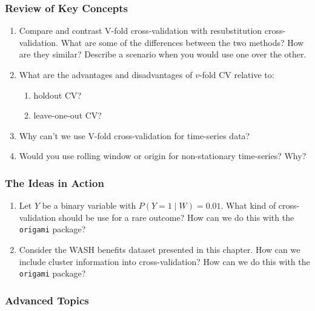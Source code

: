 \documentclass[12pt, krantz2,]{krantz}
\providecommand{\tightlist}{%
  \setlength{\itemsep}{0pt}\setlength{\parskip}{0pt}}
\theoremstyle{definition}
\theoremstyle{definition}
\theoremstyle{definition}
\newcommand{\1}{\mathbbm{1}}
\begin{document}
\hypertarget{review-of-key-concepts}{%
\subsubsection{Review of Key Concepts}\label{review-of-key-concepts}}

\begin{enumerate}
\def\labelenumi{\arabic{enumi}.}
\item
  Compare and contrast V-fold cross-validation with resubstitution
  cross-validation. What are some of the differences between the two methods?
  How are they similar? Describe a scenario when you would use one over the
  other.
\item
  What are the advantages and disadvantages of \(v\)-fold CV relative to:

  \begin{enumerate}
  \def\labelenumii{\alph{enumii}.}
  \tightlist
  \item
    holdout CV?
  \item
    leave-one-out CV?
  \end{enumerate}
\item
  Why can't we use V-fold cross-validation for time-series data?
\item
  Would you use rolling window or origin for non-stationary time-series? Why?
\end{enumerate}

\hypertarget{the-ideas-in-action}{%
\subsubsection{The Ideas in Action}\label{the-ideas-in-action}}

\begin{enumerate}
\def\labelenumi{\arabic{enumi}.}
\item
  Let \(Y\) be a binary variable with \(P(Y=1 \mid W) = 0.01\). What kind of
  cross-validation should be use for a rare outcome? How can we do this with
  the \texttt{origami} package?
\item
  Consider the WASH benefits dataset presented in this chapter. How can we
  include cluster information into cross-validation? How can we do this with
  the \texttt{origami} package?
\end{enumerate}

\hypertarget{advanced-topics}{%
\subsubsection{Advanced Topics}\label{advanced-topics}}
\end{document}
